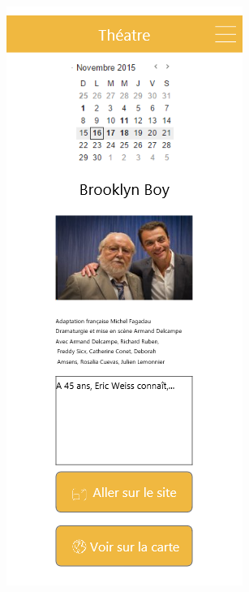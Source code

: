 \documentclass{eplmastersthesis}
\begin{document}
\begin{figure}[H]
    \centering
\begin{subfigure}[b]{0.3\textwidth}
        \includegraphics[width=\textwidth]{Images/InVision/theatre.png}

\end{subfigure}
\end{figure}
\end{document}
